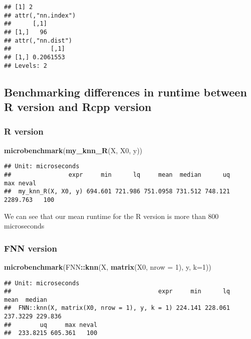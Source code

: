 \documentclass[]{article}
\newenvironment{Shaded}{\begin{snugshade}}{\end{snugshade}}
\newcommand{\DataTypeTok}[1]{\textcolor[rgb]{0.13,0.29,0.53}{#1}}
\newcommand{\DecValTok}[1]{\textcolor[rgb]{0.00,0.00,0.81}{#1}}
\newcommand{\KeywordTok}[1]{\textcolor[rgb]{0.13,0.29,0.53}{\textbf{#1}}}
\newcommand{\NormalTok}[1]{#1}
\newcommand{\OperatorTok}[1]{\textcolor[rgb]{0.81,0.36,0.00}{\textbf{#1}}}
\begin{document}
\begin{verbatim}
## [1] 2
## attr(,"nn.index")
##      [,1]
## [1,]   96
## attr(,"nn.dist")
##           [,1]
## [1,] 0.2061553
## Levels: 2
\end{verbatim}

\hypertarget{benchmarking-differences-in-runtime-between-r-version-and-rcpp-version}{%
\subsection{Benchmarking differences in runtime between R version and
Rcpp
version}\label{benchmarking-differences-in-runtime-between-r-version-and-rcpp-version}}

\hypertarget{r-version}{%
\subsubsection{R version}\label{r-version}}

\begin{Shaded}
\begin{Highlighting}[]
\KeywordTok{microbenchmark}\NormalTok{(}\KeywordTok{my_knn_R}\NormalTok{(X, X0, y))}
\end{Highlighting}
\end{Shaded}

\begin{verbatim}
## Unit: microseconds
##                expr     min      lq     mean  median      uq      max neval
##  my_knn_R(X, X0, y) 694.601 721.986 751.0958 731.512 748.121 2289.763   100
\end{verbatim}

We can see that our mean runtime for the R version is more than 800
microseconds

\hypertarget{fnn-version}{%
\subsubsection{FNN version}\label{fnn-version}}

\begin{Shaded}
\begin{Highlighting}[]
\KeywordTok{microbenchmark}\NormalTok{(FNN}\OperatorTok{::}\KeywordTok{knn}\NormalTok{(X, }\KeywordTok{matrix}\NormalTok{(X0, }\DataTypeTok{nrow =} \DecValTok{1}\NormalTok{), y, }\DataTypeTok{k=}\DecValTok{1}\NormalTok{))}
\end{Highlighting}
\end{Shaded}

\begin{verbatim}
## Unit: microseconds
##                                         expr     min      lq     mean  median
##  FNN::knn(X, matrix(X0, nrow = 1), y, k = 1) 224.141 228.061 237.3229 229.836
##        uq     max neval
##  233.8215 605.361   100
\end{verbatim}
\end{document}
